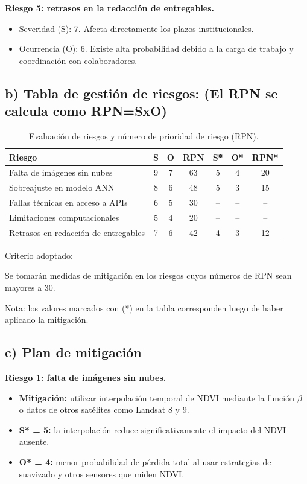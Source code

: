 \documentclass[
11pt, %
]{charter}
\begin{document}
\textbf{Riesgo 5: retrasos en la redacción de entregables.}
\begin{itemize}
    \item Severidad (S): 7. Afecta directamente los plazos institucionales.
    \item Ocurrencia (O): 6. Existe alta probabilidad debido a la carga de trabajo y coordinación con colaboradores.
\end{itemize}

\subsection*{b) Tabla de gestión de riesgos: (El RPN se calcula como RPN=SxO)}

\begin{table}[htpb]
\caption{Evaluación de riesgos y número de prioridad de riesgo (RPN).}
\label{tab:riesgos}
\centering
\begin{tabularx}{\linewidth}{@{}|X|c|c|c|c|c|c|@{}}
\hline
\rowcolor[HTML]{C0C0C0} 
\textbf{Riesgo} & \textbf{S} & \textbf{O} & \textbf{RPN} & \textbf{S*} & \textbf{O*} & \textbf{RPN*} \\ \hline
Falta de imágenes sin nubes           & 9 & 7 & 63 & 5 & 4 & 20 \\ \hline
Sobreajuste en modelo ANN             & 8 & 6 & 48 & 5 & 3 & 15 \\ \hline
Fallas técnicas en acceso a APIs      & 6 & 5 & 30 & – & – & –  \\ \hline
Limitaciones computacionales          & 5 & 4 & 20 & – & – & –  \\ \hline
Retrasos en redacción de entregables  & 7 & 6 & 42 & 4 & 3 & 12 \\ \hline
\end{tabularx}
\end{table}


Criterio adoptado: 

Se tomarán medidas de mitigación en los riesgos cuyos números de RPN sean mayores a 30. 

Nota: los valores marcados con (*) en la tabla corresponden luego de haber aplicado la mitigación.


\subsection*{c) Plan de mitigación}

\textbf{Riesgo 1: falta de imágenes sin nubes.}
\begin{itemize}
    \item \textbf{Mitigación:} utilizar interpolación temporal de NDVI mediante la función $\beta$ o datos de otros satélites como Landsat 8 y 9. 
    \item \textbf{S* = 5:} la interpolación reduce significativamente el impacto del NDVI ausente.
    \item \textbf{O* = 4:} menor probabilidad de pérdida total al usar estrategias de suavizado y otros sensores que miden NDVI.
\end{itemize}
\end{document}
